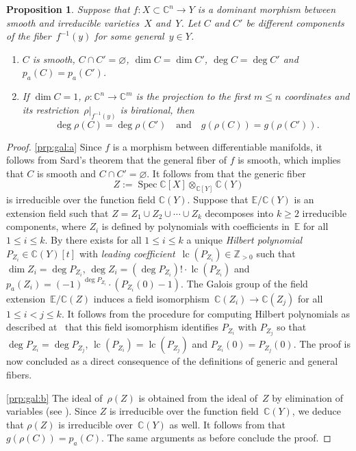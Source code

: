 \documentclass[12pt]{article}
\newtheorem{proposition}[lemma]{Proposition}
\theoremstyle{definition}
\newenvironment{claims}{\begin{enumerate}[topsep=0pt,itemsep=0pt,leftmargin=8mm,label=\textnormal{\textbf{(\alph*)}},ref=(\alph*)]}{\end{enumerate}}
\newcommand{\df}[1]{{\it #1}}
\newcommand{\st}{such that }
\renewcommand{\c}{\colon}
\newcommand{\C}{{\mathbb{C}}}
\newcommand{\Z}{{\mathbb{Z}}}
\newcommand{\E}{{\mathbb{E}}}
\newcommand{\Spec}{\operatorname{Spec}}
\newcommand{\lc}{\operatorname{lc}}
\begin{document}
\begin{proposition}
\label{prp:gal}
Suppose that $f\c X\subset\C^n\to Y$ is a dominant morphism between smooth and irreducible varieties~$X$ and~$Y$.
Let $C$ and $C'$ be different components of the fiber~$f^{-1}(y)$
for some general~$y\in Y$.
\begin{claims}
\item\label{prp:gal:a}
$C$ is smooth, $C\cap C'=\varnothing$, $\dim C=\dim C'$, $\deg C=\deg C'$ and $p_a(C)=p_a(C')$.
\item\label{prp:gal:b}
If $\dim C=1$, $\rho\c \C^n\to \C^m$ is the projection to the first $m\leq n$ coordinates and its restriction~$\rho|_{f^{-1}(y)}$
is birational, then
\[
\deg \rho(C)=\deg\rho(C')
\quad\text{and}\quad
g(\rho(C))=g(\rho(C')).
\]
\end{claims}
\end{proposition}

\begin{proof}
\ref{prp:gal:a}
Since $f$ is a morphism between differentiable manifolds,
it follows from Sard's theorem that the general fiber of $f$ is smooth,
which implies that $C$ is smooth and $C\cap C'=\varnothing$.
It follows from  that the generic fiber
\[
Z:=\Spec \C[X]\otimes_{\C[Y]}\C(Y)
\]
is irreducible over the function field $\C(Y)$.
Suppose that $\E/\C(Y)$ is an extension field \st $Z=Z_1\cup Z_2\cup\cdots\cup Z_k$
decomposes into $k\geq 2$ irreducible components,
where $Z_i$ is defined by polynomials with coefficients in~$\E$ for all $1\leq i\leq k$.
By \citep[Proposition~I.7.6 at page~52 and Exercise~I.7.2 at page~54]{1977}
there exists for all $1\leq i\leq k$ a unique \df{Hilbert polynomial}~$P_{Z_i}\in \C(Y)[t]$
with \df{leading coefficient}~$\lc(P_{Z_i})\in \Z_{>0}$
\st
$\dim Z_i=\deg P_{Z_i}$,
$\deg Z_i=(\deg P_{Z_i})!\cdot\lc(P_{Z_i})$
and
$
p_a(Z_i)=(-1)^{\deg P_{Z_i}}\cdot(P_{Z_i}(0)-1).
$
The Galois group of the field extension~$\E/\C(Z)$
induces a field isomorphism~$\C(Z_i)\to \C(Z_j)$ for all $1\leq i<j\leq k$.
It follows from the procedure for computing Hilbert polynomials
as described at~\citep[]{2007}
that this field isomorphism identifies $P_{Z_i}$ with $P_{Z_j}$
so that
$\deg P_{Z_i}=\deg P_{Z_j}$, $\lc(P_{Z_i})=\lc(P_{Z_j})$
and $P_{Z_i}(0)=P_{Z_j}(0)$.
The proof is now concluded as a direct consequence of the definitions
of generic and general fibers.

\ref{prp:gal:b}
The ideal of~$\rho(Z)$ is obtained from the ideal of~$Z$ by
elimination of variables (see \citep[,Theorem~3]{2007}).
Since $Z$ is irreducible over the function field~$\C(Y)$,
we deduce that $\rho(Z)$ is irreducible over~$\C(Y)$ as well.
It follows from \citep[Theorem~II.8.19, Remark~III.7.12.2 and Exercise~IV.1.8]{1977}
that $g(\rho(C))=p_a(C)$.
The same arguments as before conclude the proof.
\end{proof}
\end{document}
